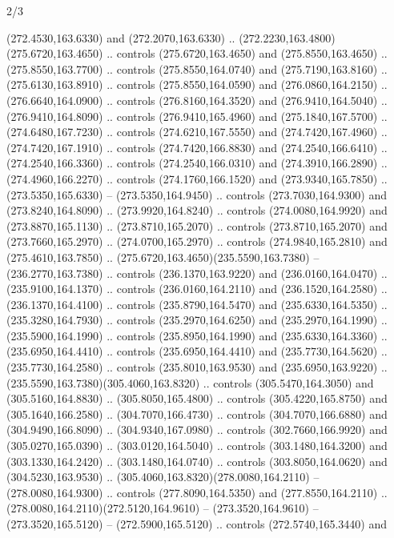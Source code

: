 \begin{flagdescription}{2/3}
\begin{scope}[xshift=0.5\flaglength,yshift=0.5\flagwidth,scale=\flagwidth/259.2]
\begin{scope}[y=0.8pt, x=0.8pt, yscale=-1,shift={(-243,-162)}]
      (272.4530,163.6330) and (272.2070,163.6330) ..
      (272.2230,163.4800)(275.6720,163.4650) .. controls (275.6720,163.4650) and
      (275.8550,163.4650) .. (275.8550,163.7700) .. controls (275.8550,164.0740) and
      (275.7190,163.8160) .. (275.6130,163.8910) .. controls (275.8550,164.0590) and
      (276.0860,164.2150) .. (276.6640,164.0900) .. controls (276.8160,164.3520) and
      (276.9410,164.5040) .. (276.9410,164.8090) .. controls (276.9410,165.4960) and
      (275.1840,167.5700) .. (274.6480,167.7230) .. controls (274.6210,167.5550) and
      (274.7420,167.4960) .. (274.7420,167.1910) .. controls (274.7420,166.8830) and
      (274.2540,166.6410) .. (274.2540,166.3360) .. controls (274.2540,166.0310) and
      (274.3910,166.2890) .. (274.4960,166.2270) .. controls (274.1760,166.1520) and
      (273.9340,165.7850) .. (273.5350,165.6330) -- (273.5350,164.9450) .. controls
      (273.7030,164.9300) and (273.8240,164.8090) .. (273.9920,164.8240) .. controls
      (274.0080,164.9920) and (273.8870,165.1130) .. (273.8710,165.2070) .. controls
      (273.8710,165.2070) and (273.7660,165.2970) .. (274.0700,165.2970) .. controls
      (274.9840,165.2810) and (275.4610,163.7850) ..
      (275.6720,163.4650)(235.5590,163.7380) -- (236.2770,163.7380) .. controls
      (236.1370,163.9220) and (236.0160,164.0470) .. (235.9100,164.1370) .. controls
      (236.0160,164.2110) and (236.1520,164.2580) .. (236.1370,164.4100) .. controls
      (235.8790,164.5470) and (235.6330,164.5350) .. (235.3280,164.7930) .. controls
      (235.2970,164.6250) and (235.2970,164.1990) .. (235.5900,164.1990) .. controls
      (235.8950,164.1990) and (235.6330,164.3360) .. (235.6950,164.4410) .. controls
      (235.6950,164.4410) and (235.7730,164.5620) .. (235.7730,164.2580) .. controls
      (235.8010,163.9530) and (235.6950,163.9220) ..
      (235.5590,163.7380)(305.4060,163.8320) .. controls (305.5470,164.3050) and
      (305.5160,164.8830) .. (305.8050,165.4800) .. controls (305.4220,165.8750) and
      (305.1640,166.2580) .. (304.7070,166.4730) .. controls (304.7070,166.6880) and
      (304.9490,166.8090) .. (304.9340,167.0980) .. controls (302.7660,166.9920) and
      (305.0270,165.0390) .. (303.0120,164.5040) .. controls (303.1480,164.3200) and
      (303.1330,164.2420) .. (303.1480,164.0740) .. controls (303.8050,164.0620) and
      (304.5230,163.9530) .. (305.4060,163.8320)(278.0080,164.2110) --
      (278.0080,164.9300) .. controls (277.8090,164.5350) and (277.8550,164.2110) ..
      (278.0080,164.2110)(272.5120,164.9610) -- (273.3520,164.9610) --
      (273.3520,165.5120) -- (272.5900,165.5120) .. controls (272.5740,165.3440) and

\end{scope}
\end{scope}
\end{flagdescription}
